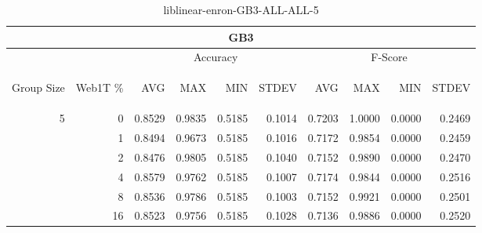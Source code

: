\begin{center}
\begin{table}[htbp]
\begin{tabular}{ | r | r | r | r | r | r | r | r | r | r |}
\hline
\multicolumn{10}{|c|}{GB3}\\
\hline
 & & \multicolumn{4}{|c|}{Accuracy} & \multicolumn{4}{|c|}{F-Score}\\ \cline{3-10}
\begin{sideways}Group Size\end{sideways} & \begin{sideways}Web1T \%\end{sideways} & \begin{sideways}AVG\end{sideways} & \begin{sideways}MAX\end{sideways} & \begin{sideways}MIN\end{sideways} & \begin{sideways}STDEV\end{sideways} & \begin{sideways}AVG\end{sideways} & \begin{sideways}MAX\end{sideways} & \begin{sideways}MIN\end{sideways} & \begin{sideways}STDEV\end{sideways}\\
\hline
\multirow{6}{*}{5}
 & 0 & 0.8529 & 0.9835 & 0.5185 & 0.1014 & 0.7203 & 1.0000 & 0.0000 & 0.2469\\ \cline{2-10}
 & 1 & 0.8494 & 0.9673 & 0.5185 & 0.1016 & 0.7172 & 0.9854 & 0.0000 & 0.2459\\ \cline{2-10}
 & 2 & 0.8476 & 0.9805 & 0.5185 & 0.1040 & 0.7152 & 0.9890 & 0.0000 & 0.2470\\ \cline{2-10}
 & 4 & 0.8579 & 0.9762 & 0.5185 & 0.1007 & 0.7174 & 0.9844 & 0.0000 & 0.2516\\ \cline{2-10}
 & 8 & 0.8536 & 0.9786 & 0.5185 & 0.1003 & 0.7152 & 0.9921 & 0.0000 & 0.2501\\ \cline{2-10}
 & 16 & 0.8523 & 0.9756 & 0.5185 & 0.1028 & 0.7136 & 0.9886 & 0.0000 & 0.2520\\ \cline{2-10}
\hline
\end{tabular}
\caption{liblinear-enron-GB3-ALL-ALL-5}
\end{table}
\end{center}

